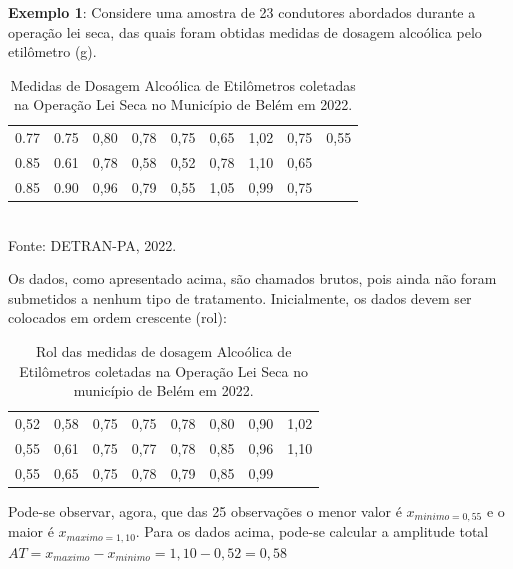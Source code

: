 \newpage

\textbf{Exemplo 1}: Considere uma amostra de 23 condutores abordados durante a operação lei seca, das
quais foram obtidas medidas de dosagem alcoólica pelo etilômetro (g).\vskip0.3cm


\begin{table}[!htb]
    \centering
    {
    \caption{Medidas de Dosagem Alcoólica de Etilômetros coletadas na Operação Lei Seca no Município de Belém em 2022.}
    \label{estatura}
    \vspace{0.2cm}
\begin{tabular}{c|c|c|c|c|c|c|c|c}
  \hline\hline
  0.77 & 0.75 & 0,80 & 0,78 & 0,75 & 0,65 & 1,02 & 0,75 & 0,55 \\
  0.85 & 0.61 & 0,78 & 0,58 & 0,52 & 0,78 & 1,10 & 0,65 &    \\
  0.85 & 0.90 & 0,96 & 0,79 & 0,55 & 1,05 & 0,99 & 0,75 &    \\
  \hline\hline
\end{tabular}}
\\
\hspace{-5.5cm}
Fonte: DETRAN-PA, 2022.
\end{table}

Os dados, como apresentado acima, são chamados brutos, pois ainda não foram submetidos a nenhum tipo de tratamento. Inicialmente, os dados devem ser colocados em ordem crescente (rol):


\begin{table}[!htb]
    \centering
    {
    \caption{Rol das medidas de dosagem Alcoólica de Etilômetros coletadas na Operação Lei Seca no município de Belém em 2022.}
    \label{estatura}
    \vspace{0.2cm}
\begin{tabular}{c|c|c|c|c|c|c|c}
  \hline\hline
  0,52 & 0,58 & 0,75 & 0,75 & 0,78 & 0,80 & 0,90 & 1,02 \\
  0,55 & 0,61 & 0,75 & 0,77 & 0,78 & 0,85 & 0,96 & 1,10  \\
  0,55 & 0,65 & 0,75 & 0,78 & 0,79 & 0,85 & 0,99 &     \\
  \hline\hline
\end{tabular}}
\end{table}



Pode-se observar, agora, que das 25 observações o menor valor é $x_{minimo = 0,55}$ e o maior é $x_{maximo= 1,10}$. Para os dados acima, pode-se calcular a amplitude total $AT = x_{maximo}-x_{minimo}=1,10-0,52=0,58$
\\



